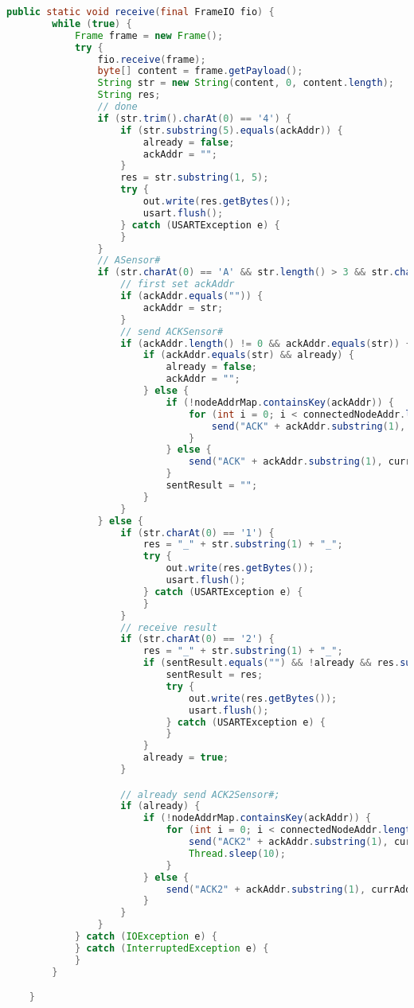 \begin{lstlisting}[label=receive, language=Java, caption=Metode receive(), numbers=none]
public static void receive(final FrameIO fio) {
		while (true) {
			Frame frame = new Frame();
			try {
				fio.receive(frame);
				byte[] content = frame.getPayload();
				String str = new String(content, 0, content.length);
				String res;
				// done
				if (str.trim().charAt(0) == '4') {
					if (str.substring(5).equals(ackAddr)) {
						already = false;
						ackAddr = "";
					}
					res = str.substring(1, 5);
					try {
						out.write(res.getBytes());
						usart.flush();
					} catch (USARTException e) {
					}
				}
				// ASensor#
				if (str.charAt(0) == 'A' && str.length() > 3 && str.charAt(1) == 'S') {
					// first set ackAddr
					if (ackAddr.equals("")) {
						ackAddr = str;
					}
					// send ACKSensor#
					if (ackAddr.length() != 0 && ackAddr.equals(str)) {
						if (ackAddr.equals(str) && already) {
							already = false;
							ackAddr = "";
						} else {
							if (!nodeAddrMap.containsKey(ackAddr)) {
								for (int i = 0; i < connectedNodeAddr.length; i++) {
									send("ACK" + ackAddr.substring(1), currAddr, connectedNodeAddr[i], fio);
								}
							} else {
								send("ACK" + ackAddr.substring(1), currAddr, nodeAddrMap.get(ackAddr), fio);
							}
							sentResult = "";
						}
					}
				} else {
					if (str.charAt(0) == '1') {
						res = "_" + str.substring(1) + "_";
						try {
							out.write(res.getBytes());
							usart.flush();
						} catch (USARTException e) {
						}
					}
					// receive result
					if (str.charAt(0) == '2') {
						res = "_" + str.substring(1) + "_";
						if (sentResult.equals("") && !already && res.substring(1, 8).equals(ackAddr.substring(1))) {
							sentResult = res;
							try {
								out.write(res.getBytes());
								usart.flush();
							} catch (USARTException e) {
							}
						}
						already = true;
					}

					// already send ACK2Sensor#;
					if (already) {
						if (!nodeAddrMap.containsKey(ackAddr)) {
							for (int i = 0; i < connectedNodeAddr.length; i++) {
								send("ACK2" + ackAddr.substring(1), currAddr, connectedNodeAddr[i], fio);
								Thread.sleep(10);
							}
						} else {
							send("ACK2" + ackAddr.substring(1), currAddr, nodeAddrMap.get(ackAddr), fio);
						}
					}
				}
			} catch (IOException e) {
			} catch (InterruptedException e) {
			}
		}

	}
\end{lstlisting}

